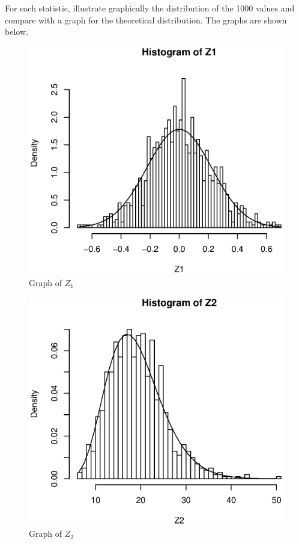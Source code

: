 \documentclass[a4paper,11pt,fleqn]{article}
\begin{document}
\vskip 0.5cm
For each statistic, illustrate graphically the distribution of the 1000 values and compare with a graph for the theoretical distribution. The graphs are shown below.
\vskip 0.5cm
\begin{figure}[h!]
\centering
\includegraphics[scale=0.8]{Z120.eps}
\caption{Graph of $Z_1$}
\label{fig: $Z_1$}
\end{figure}
\vskip 0.5cm


\begin{figure}[h!]
\centering
\includegraphics[scale=0.8]{Z220.eps}
\caption{Graph of $Z_2$}
\label{fig: $Z_2$}
\end{figure}
\vskip 0.5cm
\end{document}
